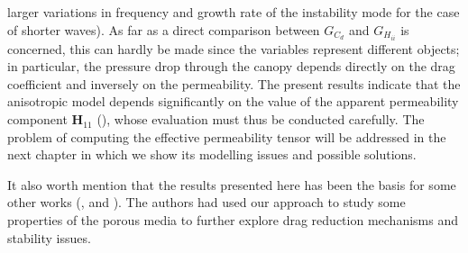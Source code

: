 larger variations in frequency and growth rate of the instability mode for the case of shorter waves).
As far as a direct comparison between $G_{C_d}$ and $G_{ {H}_{ii}}$ is concerned, this can hardly be made since
the variables represent different objects; in particular, the pressure drop through the canopy depends
directly on the drag coefficient and inversely on the permeability. The present results indicate that the anisotropic
model depends significantly on the value of the apparent permeability component $\mathbf{H}_{11}$ (\citet{zampogna2016fluid}), whose
evaluation must thus be conducted carefully. The problem of computing the effective permeability tensor will be addressed in the next chapter in which we show its modelling issues and possible solutions.

It also worth mention that the results presented here has been the basis for some other works (\citet{segura2017permeable}, \citet{sharma2017stabilitycanopy} and \citet{garcia2017analysis}). The authors had used our approach to study some properties of the porous media to further explore drag reduction mechanisms and stability issues.






